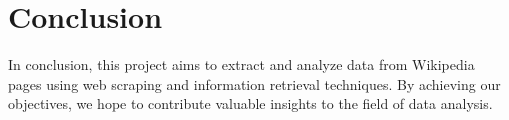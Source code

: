 \documentclass{article}
\begin{document}
\section{Conclusion}
In conclusion, this project aims to extract and analyze data from Wikipedia pages using web scraping and information retrieval techniques. By achieving our objectives, we hope to contribute valuable insights to the field of data analysis.

% 
% 
\end{document}
